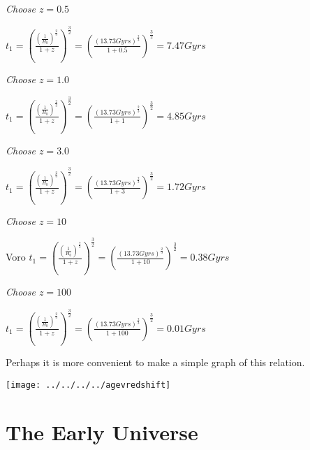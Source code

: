 \documentclass{article}
\begin{document}
{\textit{Choose $z = 0.5$}
\begin{center}
	$\boxed{ t_1 = \left(\frac{\left(\frac{1}{H_0}\right)^{\frac{2}{3}}}{1+z}\right)^{\frac{3}{2}} = \left(\frac{\left(13.73Gyrs\right)^{\frac{2}{3}}}{1+0.5}\right)^{\frac{3}{2}} = 7.47Gyrs}$
\end{center}

\textit{Choose $z = 1.0$}
\begin{center}
	$\boxed{ t_1 = \left(\frac{\left(\frac{1}{H_0}\right)^{\frac{2}{3}}}{1+z}\right)^{\frac{3}{2}} = \left(\frac{\left(13.73Gyrs\right)^{\frac{2}{3}}}{1+1}\right)^{\frac{3}{2}} = 4.85Gyrs}$
\end{center}

\textit{Choose $z = 3.0$}
\begin{center}
	$\boxed{ t_1 = \left(\frac{\left(\frac{1}{H_0}\right)^{\frac{2}{3}}}{1+z}\right)^{\frac{3}{2}} = \left(\frac{\left(13.73Gyrs\right)^{\frac{2}{3}}}{1+3}\right)^{\frac{3}{2}} = 1.72Gyrs}$
\end{center}

\textit{Choose $z = 10$}
\begin{center}Voro
	$\boxed{ t_1 = \left(\frac{\left(\frac{1}{H_0}\right)^{\frac{2}{3}}}{1+z}\right)^{\frac{3}{2}} = \left(\frac{\left(13.73Gyrs\right)^{\frac{2}{3}}}{1+10}\right)^{\frac{3}{2}} = 0.38Gyrs}$
\end{center}

\textit{Choose $z = 100$}
\begin{center}
	$\boxed{ t_1 = \left(\frac{\left(\frac{1}{H_0}\right)^{\frac{2}{3}}}{1+z}\right)^{\frac{3}{2}} = \left(\frac{\left(13.73Gyrs\right)^{\frac{2}{3}}}{1+100}\right)^{\frac{3}{2}} = 0.01Gyrs}$
\end{center}
Perhaps it is more convenient to make a simple graph of this relation. 

\begin{center}
\texttt{[image: ../../../../agevredshift]}
\end{center}

\section{The Early Universe}
}
\end{document}
